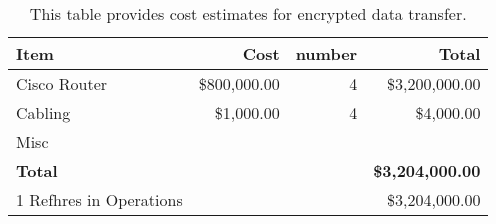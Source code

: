 \tiny \begin{longtable} {|l|r|r|r|} \caption{This table provides cost estimates for encrypted data transfer. \label{tab:ipsec}}\\ 
\hline 
\textbf{Item}&\textbf{Cost}&\textbf{number}&\textbf{Total} \\ \hline
{Cisco Router }&{\$800,000.00}&{4}&{\$3,200,000.00} \\ \hline
{Cabling}&{\$1,000.00}&{4}&{\$4,000.00} \\ \hline
{Misc}&&& \\ \hline
\textbf{Total}&\textbf{}&\textbf{}&\textbf{\$3,204,000.00} \\ \hline
{1 Refhres in Operations}&{}&{}&{\$3,204,000.00} \\ \hline
\end{longtable} \normalsize
